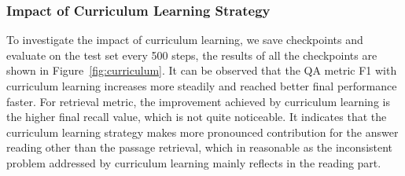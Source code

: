 \subsubsection{Impact of Curriculum Learning Strategy}


To investigate the impact of curriculum learning, we save checkpoints and evaluate on the test set every 500 steps, the results of all the checkpoints are shown in Figure~\ref{fig:curriculum}.
It can be observed that the QA metric F1 with curriculum learning increases more steadily and reached better final performance faster. 
For retrieval metric, the improvement achieved by curriculum learning is the higher final recall value, which is not quite noticeable.
It indicates that the curriculum learning strategy makes more pronounced contribution for the answer reading other than the passage retrieval, which in reasonable as the inconsistent problem addressed by curriculum learning mainly reflects in the reading part.












